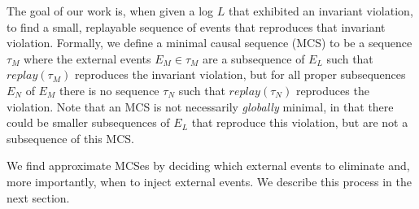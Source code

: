 The goal of our work is, when given a log $L$ that exhibited an
invariant violation, to find a small, replayable sequence of events that reproduces that
invariant violation. Formally, we define a minimal causal sequence (MCS)
to be a sequence $\tau_M$ where the external events $E_M \in \tau_M$ are a
subsequence of $E_L$ such
that $replay(\tau_M)$ reproduces the invariant violation, but for all proper
subsequences $E_N$ of $E_M$
there is no sequence $\tau_N$ such that $replay(\tau_N)$ reproduces the violation.
Note that an MCS is not necessarily {\em globally} minimal, in that there could be smaller
subsequences of $E_L$ that reproduce this violation, but are not a subsequence of this MCS.

We find approximate MCSes by deciding
which external events to eliminate and, more importantly, when to inject external
events. We describe this process in the next section.
